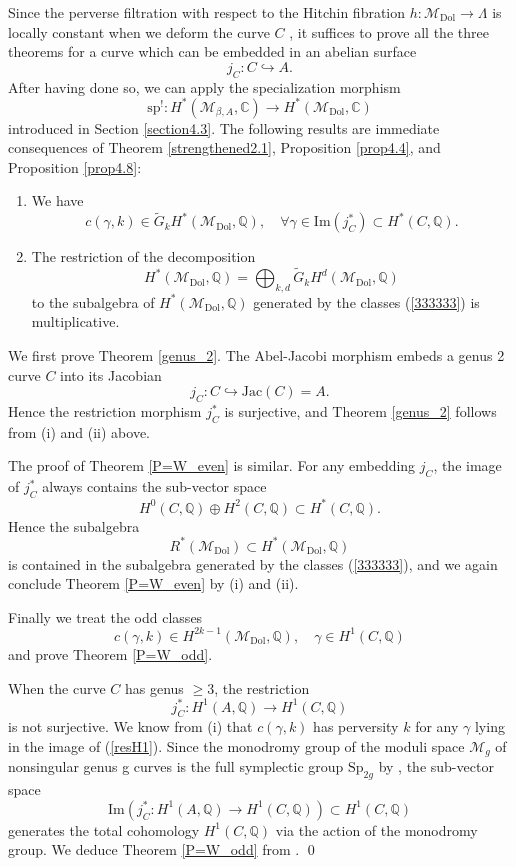 \documentclass[11pt]{amsart}
\theoremstyle{plain}
\theoremstyle{definition}
\theoremstyle{remark}
\newcommand{\BC}{{\mathbb{C}}}
\newcommand{\BQ}{{\mathbb{Q}}}
\newcommand{\CM}{{\mathcal M}}
\begin{document}
Since the perverse filtration with respect to the Hitchin fibration $h: \CM_{\mathrm{Dol}} \to \Lambda$ is locally constant when we deform the curve $C$ \cite{dCM}, it suffices to prove all the three theorems for a curve which can be embedded in an abelian surface
\[
j_C: C\hookrightarrow A.
\]
After having done so,  we can apply the specialization morphism 
\[
\mathrm{sp}^!: H^*(\CM_{\beta, A}, \BC) \to H^*(\CM_{\mathrm{Dol}}, \BC)
\]
introduced in Section \ref{section4.3}. The following results are immediate consequences of  Theorem \ref{strengthened2.1}, Proposition \ref{prop4.4}, and Proposition \ref{prop4.8}:
\begin{enumerate}
    \item[(i)] We have
    \begin{equation}\label{333333}
    c(\gamma, k) \in \widetilde{G}_kH^*(\CM_{\mathrm{Dol}}, \BQ), \quad \forall \gamma \in \mathrm{Im}({j_C^*}) \subset H^*(C, \BQ).
    \end{equation}
    \item[(ii)] The restriction of the decomposition \[
    H^*(\CM_{\mathrm{Dol}}, \BQ)= \bigoplus_{k,d}\widetilde{G}_kH^d(\CM_{\mathrm{Dol}}, \BQ)
    \]to the subalgebra of $H^*(\CM_{\mathrm{Dol}}, \BQ)$ generated by the classes (\ref{333333}) is multiplicative.
\end{enumerate}

We first prove Theorem \ref{genus_2}. The Abel-Jacobi morphism embeds a genus 2 curve $C$ into its Jacobian
\[
j_C: C \hookrightarrow \mathrm{Jac}(C) = A.
\]
Hence the restriction morphism $j_C^*$ is surjective, and Theorem \ref{genus_2} follows from (i) and (ii) above. 

The proof of Theorem \ref{P=W_even} is similar. For any embedding $j_C$, the image of $j_C^*$ always contains the sub-vector space
\[
H^0(C, \BQ) \oplus H^2(C, \BQ) \subset H^*(C, \BQ).
\]
Hence the subalgebra
\[
R^*(\CM_{\mathrm{Dol}}) \subset H^*(\CM_{\mathrm{Dol}}, \BQ)
\]
is contained in the subalgebra generated by the classes (\ref{333333}), and we again conclude Theorem \ref{P=W_even} by (i) and (ii).

Finally we treat the odd classes 
\[
c(\gamma, k) \in H^{2k-1}(\CM_{\mathrm{Dol}}, \BQ), \quad \gamma\in H^1(C, \BQ)
\]
and prove Theorem \ref{P=W_odd}. 

When the curve $C$ has genus $\geq 3$, the restriction
\begin{equation}\label{resH1}
j_C^*: H^1(A, \BQ) \to H^1(C, \BQ)
\end{equation}
is not surjective. We know from (i) that $c(\gamma, k)$ has perversity $k$ for any $\gamma$ lying in the image of (\ref{resH1}). Since the monodromy group of the moduli space $\CM_g$ of nonsingular genus g curves is the full symplectic group $\mathrm{Sp}_{2g}$ by \cite{A}, the sub-vector space 
\[
\mathrm{Im}\left({j_C^*}:H^1(A, \BQ)\to H^1(C,\BQ) \right) \subset H^1(C, \BQ)
\]
generates the total cohomology $H^1(C, \BQ)$ via the action of the monodromy group. We deduce Theorem \ref{P=W_odd} from \cite{dCM}. \qed
\end{document}
